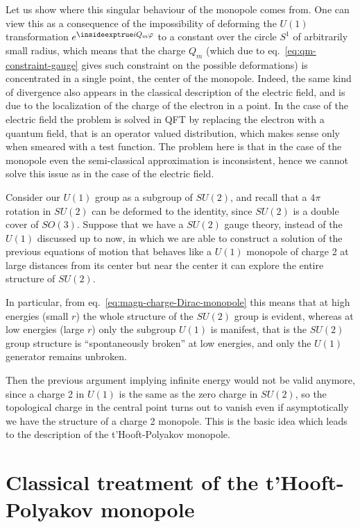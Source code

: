 \documentclass[../main/main.tex]{subfiles}
\begin{document}
Let us show where this singular behaviour of the monopole comes from. One can view this as a consequence of the impossibility of deforming the $U(1)$ transformation $\lexp{iQ_m\varphi}$ to a constant over the circle $S^1$ of arbitrarily small radius, which means that the charge $Q_m$ (which due to eq.~\eqref{eq:qm-constraint-gauge} gives such constraint on the possible deformations) is concentrated in a single point, the center of the monopole. Indeed, the same kind of divergence also appears in the classical description of the electric field, and is due to the localization of the charge of the electron in a point. In the case of the electric field the problem is solved in QFT by replacing the electron with a quantum field, that is an operator valued distribution, which makes sense only when smeared with a test function. 
The problem here is that  in the case of the monopole even the semi-classical approximation is inconsistent, hence we cannot solve this issue as in the case of the electric field. 

\skipline

Consider our $U(1)$ group as a subgroup of $SU(2)$, and recall that a $4\pi$ rotation in $SU(2)$ can be deformed to the identity, since $SU(2)$ is a double cover of $SO(3)$. Suppose that we have a $SU(2)$ gauge theory, instead of the $U(1)$ discussed up to now, in which we are able to construct a solution of the previous equations of motion that behaves like a $U(1)$ monopole of charge 2 at large distances from its center but near the center it can explore the entire structure of $SU(2)$. 

In particular, from eq.~\eqref{eq:magn-charge-Dirac-monopole} this means that at high energies (small $r$) the whole structure of the $SU(2)$ group is evident, whereas at low energies (large $r$) only the subgroup $U(1)$ is manifest, that is the $SU(2)$ group structure is ``spontaneously broken'' at low energies, and only the $U(1)$ generator remains unbroken. 

Then the previous argument implying infinite energy would not be valid anymore, since a charge 2 in $U(1)$ is the same as the zero charge in $SU(2)$, so the topological charge in the central point turns out to vanish even if asymptotically we have the structure of a charge 2 monopole. This is the basic idea which leads to the description of the t'Hooft-Polyakov monopole. 

\section{Classical treatment of the t'Hooft-Polyakov monopole}
\end{document}

